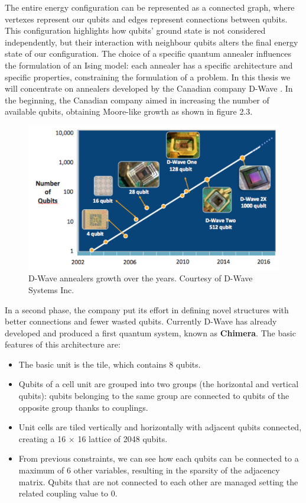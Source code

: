 The entire energy configuration can be represented as a connected graph, where vertexes represent our qubits and edges represent connections between qubits. This configuration highlights how qubits' ground state is not considered independently, but their interaction with neighbour qubits alters the final energy state of our configuration. The choice of a specific quantum annealer influences the formulation of an Ising model: each annealer has a specific architecture and specific properties, constraining the formulation of a problem. In this thesis we will concentrate on annealers developed by the Canadian company D-Wave \cite{Dwave}. In the beginning, the Canadian company aimed in increasing the number of available qubits, obtaining Moore-like growth as shown in figure 2.3. 
\begin{figure}[t]
	\begin{center}
	\includegraphics{images/DwaveMoore.PNG}
	\caption{D-Wave annealers growth over the years. Courtesy of D-Wave Systems Inc.}
	\end{center}
\end{figure}
In a second phase, the company put its effort in defining novel structures with better connections and fewer wasted qubits. Currently D-Wave has already developed and produced a first quantum system, known as \textbf{Chimera}. The basic features of this architecture are:

\begin{itemize}
    \item The basic unit is the tile, which contains 8 qubits.
    \item Qubits of a cell unit are grouped into two groups (the horizontal and vertical qubits): qubits belonging to the same group are connected to qubits of the opposite group thanks to couplings.
    \item Unit cells are tiled vertically and horizontally with adjacent qubits connected, creating a 16 $\times$ 16 lattice of 2048 qubits.
    \item From previous constraints, we can see how each qubits can be connected to a maximum of 6 other variables, resulting in the sparsity of the adjacency matrix. Qubits that are not connected to each other are managed setting the related coupling value to 0.
\end{itemize}

